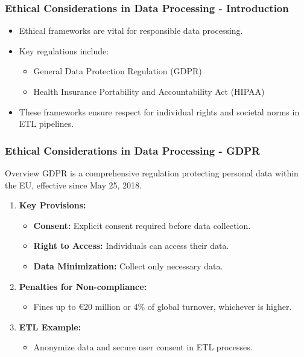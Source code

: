 \documentclass[aspectratio=169]{beamer}
\begin{document}
\begin{frame}[fragile]
    \frametitle{Ethical Considerations in Data Processing - Introduction}
    \begin{itemize}
        \item Ethical frameworks are vital for responsible data processing.
        \item Key regulations include:
        \begin{itemize}
            \item General Data Protection Regulation (GDPR)
            \item Health Insurance Portability and Accountability Act (HIPAA)
        \end{itemize}
        \item These frameworks ensure respect for individual rights and societal norms in ETL pipelines.
    \end{itemize}
\end{frame}

\begin{frame}[fragile]
    \frametitle{Ethical Considerations in Data Processing - GDPR}
    \begin{block}{Overview}
        GDPR is a comprehensive regulation protecting personal data within the EU, effective since May 25, 2018.
    \end{block}
    
    \begin{enumerate}
        \item \textbf{Key Provisions:}
        \begin{itemize}
            \item \textbf{Consent:} Explicit consent required before data collection.
            \item \textbf{Right to Access:} Individuals can access their data.
            \item \textbf{Data Minimization:} Collect only necessary data.
        \end{itemize}

        \item \textbf{Penalties for Non-compliance:}
        \begin{itemize}
            \item Fines up to €20 million or 4\% of global turnover, whichever is higher.
        \end{itemize}

        \item \textbf{ETL Example:} 
        \begin{itemize}
            \item Anonymize data and secure user consent in ETL processes.
        \end{itemize}
    \end{enumerate}
\end{frame}
\end{document}
